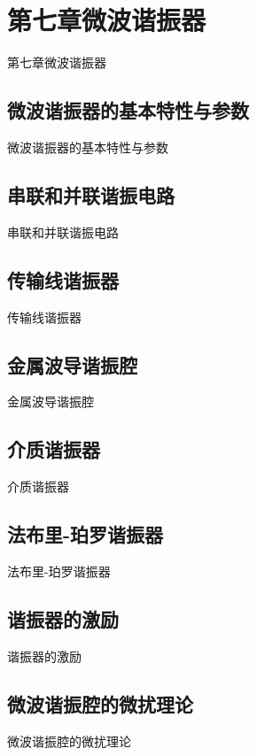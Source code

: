 \section{第七章\quad 微波谐振器}
\begin{frame}{第七章\quad 微波谐振器}

\end{frame}

\subsection{微波谐振器的基本特性与参数}
\begin{frame}{微波谐振器的基本特性与参数}

\end{frame}

\subsection{串联和并联谐振电路}
\begin{frame}{串联和并联谐振电路}

\end{frame}

\subsection{传输线谐振器}
\begin{frame}{传输线谐振器}

\end{frame}

\subsection{金属波导谐振腔}
\begin{frame}{金属波导谐振腔}

\end{frame}

\subsection{介质谐振器}
\begin{frame}{介质谐振器}

\end{frame}

\subsection{法布里-珀罗谐振器}
\begin{frame}{法布里-珀罗谐振器}

\end{frame}

\subsection{谐振器的激励}
\begin{frame}{谐振器的激励}

\end{frame}

\subsection{微波谐振腔的微扰理论}
\begin{frame}{微波谐振腔的微扰理论}

\end{frame}

